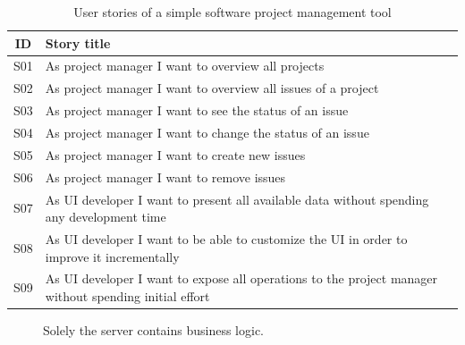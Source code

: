 \begin{table}
  \begin{center}
    \begin{tabular}{ |c|l| }
      \hline
      ID & Story title \\
      \hline
      S01 & As project manager I want to overview all projects \\
      S02 & As project manager I want to overview all issues of a project \\
      S03 & As project manager I want to see the status of an issue \\
      S04 & As project manager I want to change the status of an issue \\
      S05 & As project manager I want to create new issues \\
      S06 & As project manager I want to remove issues \\
      S07 & As UI developer I want to present all available data without spending any development time \\
      S08 & As UI developer I want to be able to customize the UI in order to improve it incrementally \\
      S09 & As UI developer I want to expose all operations to the project manager without spending initial effort \\
      \hline
    \end{tabular}
    \caption{User stories of a simple software project management tool}
  \end{center}
\end{table}

\begin{figure}[!htb]
  \caption{\label{fig:my-label} Solely the server contains business logic.}
\end{figure}

